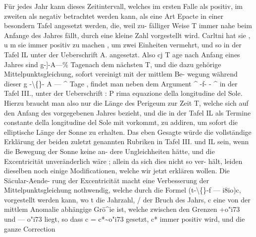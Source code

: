 \documentclass[12pt,a4paper]{article}
\begin{document}
Für jedes Jahr kann dieses Zeitintervall, welches im ersten Falle als positiv, im zweiten als negativ\newline
betrachtet werden kann, als eine Art Epacte in einer besondern Tafel angesetzt werden, die, weil zu-\newline
fälliger Weise T immer nahe beim Anfange des Jahres fällt, durch eine kleine Zahl vorgestellt wird.\newline
Carltni hat sie , u m sie immer positiv zu machen , um zwei Einheiten vermehrt, und so in der Tafel IL\newline
unter der Ueberschrift A. angesetzt. Also cj T age nach Anfang eines Jahres sind g-]-A---\% Tagenach\newline
dem nächsten T, und die dazu gehörige Mittelpunktsgleichung, sofort vereinigt mit der mittlem Be-\newline
wegung während dieser g -\textbackslash\{\}- A --- \^{} Tage , findet man neben dem Argument \^{} -f- - \^{} in der Tafel III.,\newline
unter der Ueberschrift : P rima equazione della longitudine del Sole. Hierzu braucht man also nur die\newline
Länge des Perigeum zur Zeit T, welche sich auf den Anfang des vorgegebenen Jahres bezieht, und die\newline
in der Tafel IL als Termine constante della longitudine del Sole mit vorkommt, zu addiren, um sofort\newline
die elliptische Länge der Sonne zu erhalten. Das eben Gesagte würde die vollständige Erklärung der\newline
beiden zuletzt genannten Rubriken in Tafel III. und IL sein, wenn die Bewegung der Sonne keine an-\newline
dere Ungleichheiten hätte, und die Excentricität unveränderlich wäre ; allein da sich dies nicht so ver-\newline
hält, leiden dieselben noch einige Modificationen, welche wir jetzt erklären wollen. Die Säcular-Aende-\newline
rung der Excentricität macht eine Verbesserung der Mittelpunktsgleichung nothwendig, welche durch\newline
die Formel (t-\textbackslash\{\}-f --- i8io)c, vorgestellt werden kann, wo t die Jahrzahl, / der Bruch des Jahrs, c eine\newline
von der mittlem Anomalie abhängige Grö\^{}ie ist, welche zwischen den Grenzen +o"i73 und --- o"i73\newline
liegt, so dass c = c*\textasciitilde{}o"i73 gesetzt, c* immer positiv wird, und die ganze Correction\newline
\end{document}
